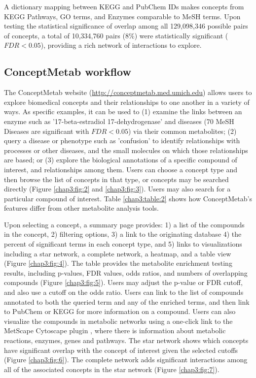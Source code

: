 A dictionary mapping between KEGG and PubChem IDs makes concepts from KEGG Pathways, GO terms, and Enzymes comparable to MeSH terms. Upon testing the statistical significance of overlap among all 129,098,346 possible pairs of concepts, a total of 10,334,760 pairs (8\%) were statistically significant ($FDR< 0.05$), providing a rich network of interactions to explore.

\subsection{ConceptMetab workflow}
\label{conceptmetab_results_workflow}

The ConceptMetab website (\url{http://conceptmetab.med.umich.edu}) allows users to explore biomedical concepts and their relationships to one another in a variety of ways. As specific examples, it can be used to (1) examine the links between an enzyme such as '17-beta-estradiol 17-dehydrogenase' and diseases (70 MeSH Diseases are significant with $FDR < 0.05$) via their common metabolites; (2) query a disease or phenotype such as 'confusion' to identify relationships with processes or other diseases, and the small molecules on which those relationships are based; or (3) explore the biological annotations of a specific compound of interest, and relationships among them. Users can choose a concept type and then browse the list of concepts in that type, or concepts may be searched directly (Figure \ref{chap3:fig:2} and \ref{chap3:fig:3}). Users may also search for a particular compound of interest. Table \ref{chap3:table:2} shows how ConceptMetab's features differ from other metabolite analysis tools.

Upon selecting a concept, a summary page provides: 1) a list of the compounds in the concept, 2) filtering options, 3) a link to the originating database 4) the percent of significant terms in each concept type, and 5) links to visualizations including a star network, a complete network, a heatmap, and a table view (Figure \ref{chap3:fig:4}). The table provides the metabolite enrichment testing results, including p-values, FDR values, odds ratios, and numbers of overlapping compounds (Figure \ref{chap3:fig:5}). Users may adjust the p-value or FDR cutoff, and also use a cutoff on the odds ratio. Users can link to the list of compounds annotated to both the queried term and any of the enriched terms, and then link to PubChem or KEGG for more information on a compound. Users can also visualize the compounds in metabolic networks using a one-click link to the MetScape Cytoscape plugin \cite{Karnovsky:2012cf}, where there is information about metabolic reactions, enzymes, genes and pathways. The star network shows which concepts have significant overlap with the concept of interest given the selected cutoffs (Figure \ref{chap3:fig:6}). The complete network adds significant interactions among all of the associated concepts in the star network (Figure \ref{chap3:fig:7}).

